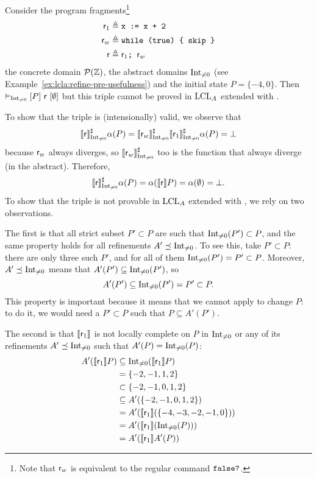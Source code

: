 \begin{example}\label{ex:lcla:refine-pre-incomplete}
	Consider the program fragments\footnote{Note that $\mathsf{r}_w$ is equivalent to the regular command $\texttt{false?}$.}
	\begin{align*}
		\mathsf{r}_1 & \triangleq \texttt{x := x + 2}              \\
		\mathsf{r}_w & \triangleq \texttt{while (true) \{ skip \}} \\
		\mathsf{r}   & \triangleq \mathsf{r}_1 \texttt{; }\mathsf{r}_w
	\end{align*}
	the concrete domain $\mathcal{P}(\mathbb{Z})$, the abstract domains $\text{Int}_{\neq 0}$ (see Example~\ref{ex:lcla:refine-pre-usefulness}) and the initial state $P = \{ -4, 0 \}$.
	Then $\vDash_{\text{Int}_{\neq 0}}\nobreak[P]~\mathsf{r}~[\emptyset]$ but this triple cannot be proved in $\text{LCL}_A$ extended with .

	To show that the triple is (intensionally) valid, we observe that
	\[
	\llbracket\mathsf{r}\rrbracket^{\sharp}_{\text{Int}_{\neq 0}} \alpha(P) = \llbracket\mathsf{r}_w\rrbracket^{\sharp}_{\text{Int}_{\neq 0}} \llbracket\mathsf{r}_1\rrbracket^{\sharp}_{\text{Int}_{\neq 0}} \alpha(P) = \bot
	\]
	because $\mathsf{r}_w$ always diverges, so $\llbracket\mathsf{r}_w\rrbracket^{\sharp}_{\text{Int}_{\neq 0}}$ too is the function that always diverge (in the abstract). Therefore,
	\[
	\llbracket\mathsf{r}\rrbracket^{\sharp}_{\text{Int}_{\neq 0}} \alpha(P) = \alpha(\llbracket\mathsf{r}\rrbracket P) = \alpha(\emptyset) = \bot .
	\]
	To show that the triple is not provable in $\text{LCL}_A$ extended with , we rely on two observations.

	The first is that all strict subset $P' \subset P$ are such that $\text{Int}_{\neq 0}(P') \subset P$, and the same property holds for all refinements $A' \preceq \text{Int}_{\neq 0}$. To see this, take $P' \subset P$: there are only three such $P'$, and for all of them $\text{Int}_{\neq 0}(P') = P' \subset P$. Moreover, $A' \preceq \text{Int}_{\neq 0}$ means that $A'(P') \subseteq \text{Int}_{\neq 0}(P')$, so
	\[
	A'(P') \subseteq \text{Int}_{\neq 0}(P') = P' \subset P .
	\]
	This property is important because it means that we cannot apply  to change $P$: to do it, we would need a $P' \subset P$ such that $P \subseteq A'(P')$.

	The second is that $\llbracket\mathsf{r}_1\rrbracket$ is not locally complete on $P$ in $\text{Int}_{\neq 0}$ or any of its refinements $A' \preceq \text{Int}_{\neq 0}$ such that $A'(P) = \text{Int}_{\neq 0}(P)$:
	\begin{align*}
		A'(\llbracket\mathsf{r}_1\rrbracket P) & \subseteq \text{Int}_{\neq 0}(\llbracket\mathsf{r}_1\rrbracket P)      \\
		                      & = \{ -2, -1, 1, 2 \}                            \\
		                      & \subset \{ -2, -1, 0, 1, 2 \}                   \\
		                      & \subseteq A'(\{ -2, -1, 0, 1, 2 \})             \\
		                      & = A'(\llbracket\mathsf{r}_1\rrbracket (\{ -4, -3, -2, -1, 0 \})) \\
		                      & = A'(\llbracket\mathsf{r}_1\rrbracket (\text{Int}_{\neq 0}(P)))        \\
		                      & = A'(\llbracket\mathsf{r}_1\rrbracket A'(P))
	\end{align*}


\end{example}
